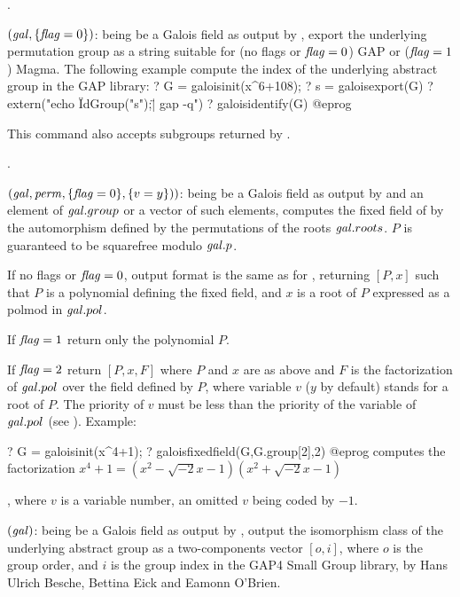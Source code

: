 .

$(\hbox{\it gal\/},\{\hbox{\it f\kern0pt lag\/}=0\})$:
 being be a Galois field as output by ,
export the underlying permutation group as a string suitable
for (no flags or $\hbox{\it f\kern0pt lag\/}=0$) GAP or ($\hbox{\it f\kern0pt lag\/}=1$) Magma. The following example
compute the index of the underlying abstract group in the GAP library:
\bprog
? G = galoisinit(x^6+108);
? s = galoisexport(G)
? extern("echo \"IdGroup("s");\" | gap -q")
? galoisidentify(G)
@eprog

This command also accepts subgroups returned by .

.

$(\hbox{\it gal\/},\hbox{\it perm\/},\{\hbox{\it f\kern0pt lag\/}=0\},\{v=y\}))$:
 being be a Galois field as output by  and
 an element of $\hbox{\it gal\/}.group$ or a vector of such elements,
computes the fixed field of  by the automorphism defined by the
permutations  of the roots $\hbox{\it gal\/}.roots$. $P$ is guaranteed to
be squarefree modulo $\hbox{\it gal\/}.p$.

If no flags or $\hbox{\it f\kern0pt lag\/}=0$, output format is the same as for ,
returning $[P,x]$ such that $P$ is a polynomial defining the fixed field, and
$x$ is a root of $P$ expressed as a polmod in $\hbox{\it gal\/}.pol$.

If $\hbox{\it f\kern0pt lag\/}=1$ return only the polynomial $P$.

If $\hbox{\it f\kern0pt lag\/}=2$ return $[P,x,F]$ where $P$ and $x$ are as above and $F$ is the
factorization of $\hbox{\it gal\/}.pol$ over the field defined by $P$, where
variable $v$ ($y$ by default) stands for a root of $P$. The priority of $v$
must be less than the priority of the variable of $\hbox{\it gal\/}.pol$ (see
). Example:

\bprog
? G = galoisinit(x^4+1);
? galoisfixedfield(G,G.group[2],2)
@eprog\noindent
computes the factorization  $x^4+1=(x^2-\sqrt{-2}x-1)(x^2+\sqrt{-2}x-1)$

, where $v$ is a variable number, an omitted $v$ being coded by $-1$.

$(\hbox{\it gal\/})$:
 being be a Galois field as output by ,
output the isomorphism class of the underlying abstract group as a
two-components vector $[o,i]$, where $o$ is the group order, and $i$ is the
group index in the GAP4 Small Group library, by Hans Ulrich Besche, Bettina
Eick and Eamonn O'Brien.

